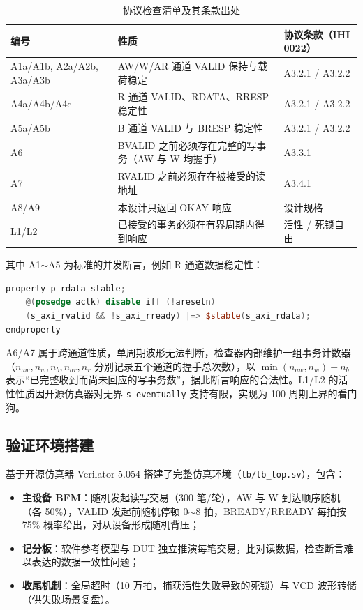 \documentclass[12pt, a4paper, oneside]{ctexart}
\begin{document}
\begin{table}[H]
\centering
\caption{协议检查清单及其条款出处}
\label{tab:rules}
\begin{tabularx}{\textwidth}{lXl}
\toprule
编号 & 性质 & 协议条款（IHI 0022） \\
\midrule
A1a/A1b, A2a/A2b, A3a/A3b & AW/W/AR 通道 VALID 保持与载荷稳定 & A3.2.1 / A3.2.2 \\
A4a/A4b/A4c & R 通道 VALID、RDATA、RRESP 稳定性 & A3.2.1 / A3.2.2 \\
A5a/A5b & B 通道 VALID 与 BRESP 稳定性 & A3.2.1 / A3.2.2 \\
A6 & BVALID 之前必须存在完整的写事务（AW 与 W 均握手） & A3.3.1 \\
A7 & RVALID 之前必须存在被接受的读地址 & A3.4.1 \\
A8/A9 & 本设计只返回 OKAY 响应 & 设计规格 \\
L1/L2 & 已接受的事务必须在有界周期内得到响应 & 活性 / 死锁自由 \\
\bottomrule
\end{tabularx}
\end{table}

其中 A1$\sim$A5 为标准的并发断言，例如 R 通道数据稳定性：
\begin{lstlisting}[language=Verilog]
property p_rdata_stable;
    @(posedge aclk) disable iff (!aresetn)
    (s_axi_rvalid && !s_axi_rready) |=> $stable(s_axi_rdata);
endproperty
\end{lstlisting}

A6/A7 属于跨通道性质，单周期波形无法判断，检查器内部维护一组事务计数器（$n_{aw}, n_w, n_b, n_{ar}, n_r$ 分别记录五个通道的握手总次数），以 $\min(n_{aw}, n_w) - n_b$ 表示``已完整收到而尚未回应的写事务数''，据此断言响应的合法性。L1/L2 的活性性质因开源仿真器对无界 \texttt{s\_eventually} 支持有限，实现为 100 周期上界的看门狗。

\subsection{验证环境搭建}

基于开源仿真器 Verilator 5.054 搭建了完整仿真环境（\texttt{tb/tb\_top.sv}），包含：
\begin{itemize}
  \item \textbf{主设备 BFM}：随机发起读写交易（300 笔/轮），AW 与 W 到达顺序随机（各 50\%），VALID 发起前随机停顿 0$\sim$8 拍，BREADY/RREADY 每拍按 75\% 概率给出，对从设备形成随机背压；
  \item \textbf{记分板}：软件参考模型与 DUT 独立推演每笔交易，比对读数据，检查断言难以表达的数据一致性问题；
  \item \textbf{收尾机制}：全局超时（10 万拍，捕获活性失败导致的死锁）与 VCD 波形转储（供失败场景复盘）。
\end{itemize}
\end{document}
